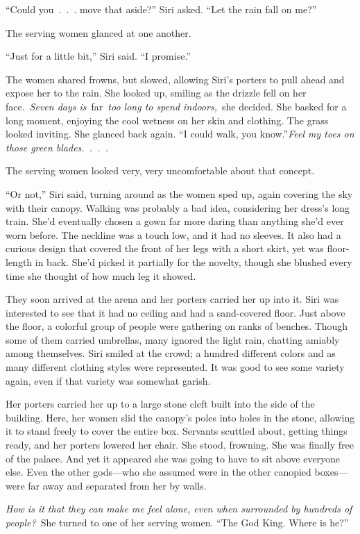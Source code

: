 “Could you~.~.~. move that aside?” Siri asked. “Let the rain fall on me?”

The serving women glanced at one another.

“Just for a little bit,” Siri said. “I promise.”

The women shared frowns, but slowed, allowing Siri’s porters to pull ahead and expose her to the rain. She looked up, smiling as the drizzle fell on her face.~\textit{Seven days is}~far~\textit{too long to spend indoors,}~she decided. She basked for a long moment, enjoying the cool wetness on her skin and clothing. The grass looked inviting. She glanced back again. “I could walk, you know.”\textit{Feel my toes on those green blades.~.~.~.}

The serving women looked very, very uncomfortable about that concept.

“Or not,” Siri said, turning around as the women sped up, again covering the sky with their canopy. Walking was probably a bad idea, considering her dress’s long train. She’d eventually chosen a gown far more daring than anything she’d ever worn before. The neckline was a touch low, and it had no sleeves. It also had a curious design that covered the front of her legs with a short skirt, yet was floor-length in back. She’d picked it partially for the novelty, though she blushed every time she thought of how much leg it showed.

They soon arrived at the arena and her porters carried her up into it. Siri was interested to see that it had no ceiling and had a sand-covered floor. Just above the floor, a colorful group of people were gathering on ranks of benches. Though some of them carried umbrellas, many ignored the light rain, chatting amiably among themselves. Siri smiled at the crowd; a hundred different colors and as many different clothing styles were represented. It was good to see some variety again, even if that variety was somewhat garish.

Her porters carried her up to a large stone cleft built into the side of the building. Here, her women slid the canopy’s poles into holes in the stone, allowing it to stand freely to cover the entire box. Servants scuttled about, getting things ready, and her porters lowered her chair. She stood, frowning. She was finally free of the palace. And yet it appeared she was going to have to sit above everyone else. Even the other gods—who she assumed were in the other canopied boxes—were far away and separated from her by walls.

\textit{How is it that they can make me feel alone, even when surrounded by hundreds of people?}~She turned to one of her serving women. “The God King. Where is he?”


